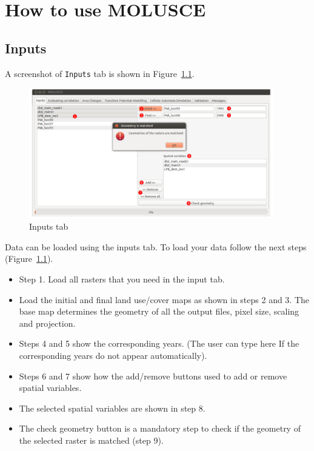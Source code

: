 \documentclass{report}
\begin{document}
\chapter{How to use MOLUSCE}

\section{Inputs}
A screenshot of \verb+Inputs+ tab is shown in Figure~\ref{fig:inputs_tab}.

\begin{figure}[h!]
\centering
\includegraphics[width=0.95\textwidth]{img/inputs_tab.png}
\caption{Inputs tab}
\label{fig:inputs_tab}
\end{figure}

Data can be loaded using the inputs tab. To load your data follow the next steps (Figure~\ref{fig:inputs_tab}).

\begin{itemize}

  \item Step 1. Load all rasters that you need in the input tab. 
  \item Load the initial and final land use/cover maps as shown in steps 2 and 3. The base map determines
  the geometry of all the output files, pixel size, scaling and projection.
  \item Steps 4 and 5 show the corresponding years. (The user can type here If the corresponding years do
  not appear automatically).
  \item Steps 6 and 7 show how the add/remove buttons used to add or remove spatial variables.
  \item The selected spatial variables are shown in step 8.
  \item The check geometry button is a mandatory step to check if the geometry of the selected raster is
  matched (step 9).
\end{itemize}
\end{document}
